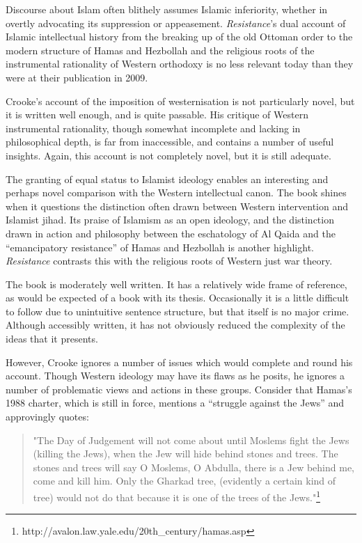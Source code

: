 \documentclass[12pt,a4paper]{report}
\newcounter{count}
\begin{document}
\begin{multicols}{2}

Discourse about Islam often blithely assumes Islamic inferiority,
whether in overtly advocating its suppression or appeasement.
\textit{Resistance}'s dual account of Islamic intellectual history from
the breaking up of the old Ottoman order to the modern structure of
Hamas and Hezbollah and the religious roots of the instrumental
rationality of Western orthodoxy is no less relevant today than they
were at their publication in 2009.

Crooke's account of the imposition of westernisation is not particularly
novel, but it is written well enough, and is quite passable. His
critique of Western instrumental rationality, though somewhat incomplete
and lacking in philosophical depth, is far from inaccessible, and
contains a number of useful insights. Again, this account is not
completely novel, but it is still adequate.

The granting of equal status to Islamist ideology enables an interesting
and perhaps novel comparison with the Western intellectual canon. The
book shines when it questions the distinction often drawn between
Western intervention and Islamist jihad. Its praise of Islamism as an
open ideology, and the distinction drawn in action and philosophy
between the eschatology of Al Qaida and the ``emancipatory resistance''
of Hamas and Hezbollah is another highlight. \textit{Resistance} contrasts
this with the religious roots of Western just war theory.

The book is moderately well written. It has a relatively wide frame of
reference, as would be expected of a book with its thesis. Occasionally
it is a little difficult to follow due to unintuitive sentence
structure, but that itself is no major crime. Although accessibly
written, it has not obviously reduced the complexity of the ideas that
it presents.

However, Crooke ignores a number of issues which would complete and
round his account. Though Western ideology may have its flaws as he
posits, he ignores a number of problematic views and actions in these
groups. Consider that Hamas's 1988 charter, which is still in force,
mentions a ``struggle against the Jews'' and approvingly quotes:

\begin{quote}
	"The Day of Judgement will not come about until Moslems fight the Jews
	(killing the Jews), when the Jew will hide behind stones and trees. The
	stones and trees will say O Moslems, O Abdulla, there is a Jew behind
	me, come and kill him. Only the Gharkad tree, (evidently a certain kind
	of tree) would not do that because it is one of the trees of the
	Jews."\footnote{http://avalon.law.yale.edu/20th\_century/hamas.asp}
\end{quote}


\end{multicols}
\end{document}
